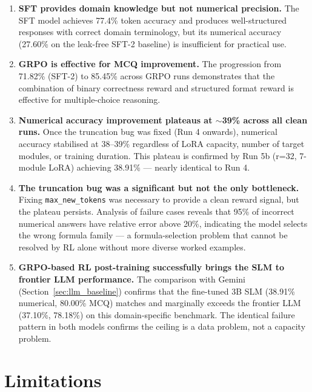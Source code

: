 \documentclass[12pt]{report}
\begin{document}
\begin{enumerate}
    \item \textbf{SFT provides domain knowledge but not numerical precision.} The SFT model achieves 77.4\% token accuracy and produces well-structured responses with correct domain terminology, but its numerical accuracy (27.60\% on the leak-free SFT-2 baseline) is insufficient for practical use.
    
    \item \textbf{GRPO is effective for MCQ improvement.} The progression from 71.82\% (SFT-2) to 85.45\% across GRPO runs demonstrates that the combination of binary correctness reward and structured format reward is effective for multiple-choice reasoning.
    
    \item \textbf{Numerical accuracy improvement plateaus at $\sim$39\% across all clean runs.} Once the truncation bug was fixed (Run 4 onwards), numerical accuracy stabilised at 38--39\% regardless of LoRA capacity, number of target modules, or training duration. This plateau is confirmed by Run 5b (r=32, 7-module LoRA) achieving 38.91\% --- nearly identical to Run 4.

    \item \textbf{The truncation bug was a significant but not the only bottleneck.} Fixing \texttt{max\_new\_tokens} was necessary to provide a clean reward signal, but the plateau persists. Analysis of failure cases reveals that 95\% of incorrect numerical answers have relative error above 20\%, indicating the model selects the wrong formula family --- a formula-selection problem that cannot be resolved by RL alone without more diverse worked examples.

    \item \textbf{GRPO-based RL post-training successfully brings the SLM to frontier LLM performance.} The comparison with Gemini (Section~\ref{sec:llm_baseline}) confirms that the fine-tuned 3B SLM (38.91\% numerical, 80.00\% MCQ) matches and marginally exceeds the frontier LLM (37.10\%, 78.18\%) on this domain-specific benchmark. The identical failure pattern in both models confirms the ceiling is a data problem, not a capacity problem.
\end{enumerate}

\section{Limitations}
\end{document}
